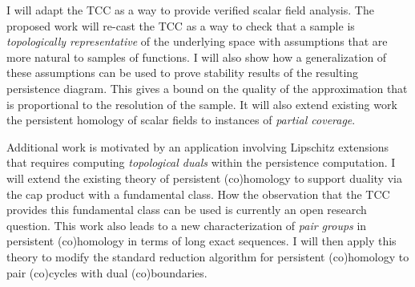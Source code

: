 
I will adapt the TCC as a way to provide verified scalar field analysis.
The proposed work will re-cast the TCC as a way to check that a sample is \emph{topologically representative} of the underlying space with assumptions that are more natural to samples of functions.
I will also show how a generalization of these assumptions can be used to prove stability results of the resulting persistence diagram.
This gives a bound on the quality of the approximation that is proportional to the resolution of the sample.
It will also extend existing work the persistent homology of scalar fields to instances of \emph{partial coverage}.

Additional work is motivated by an application involving Lipschitz extensions that requires computing \emph{topological duals} within the persistence computation.
I will extend the existing theory of persistent (co)homology to support duality via the cap product with a fundamental class.
How the observation that the TCC provides this fundamental class can be used is currently an open research question.
This work also leads to a new characterization of \emph{pair groups} in persistent (co)homology in terms of long exact sequences.
I will then apply this theory to modify the standard reduction algorithm for persistent (co)homology to pair (co)cycles with dual (co)boundaries.
